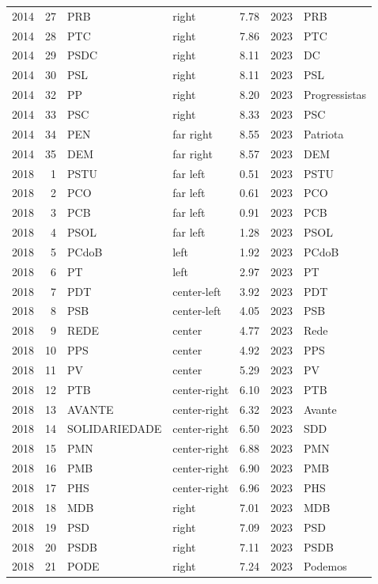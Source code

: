 \documentclass[11pt]{article}
\begin{document}
\begin{longtable}{rrlllrl}
2014 & 27 & PRB & right & 7.78 & 2023 & PRB \\
2014 & 28 & PTC & right & 7.86 & 2023 & PTC \\
2014 & 29 & PSDC & right & 8.11 & 2023 & DC \\
2014 & 30 & PSL & right & 8.11 & 2023 & PSL \\
2014 & 32 & PP & right & 8.20 & 2023 & Progressistas \\
2014 & 33 & PSC & right & 8.33 & 2023 & PSC \\
2014 & 34 & PEN & far right & 8.55 & 2023 & Patriota \\
2014 & 35 & DEM & far right & 8.57 & 2023 & DEM \\
2018 & 1 & PSTU & far left & 0.51 & 2023 & PSTU \\
2018 & 2 & PCO & far left & 0.61 & 2023 & PCO \\
2018 & 3 & PCB & far left & 0.91 & 2023 & PCB \\
2018 & 4 & PSOL & far left & 1.28 & 2023 & PSOL \\
2018 & 5 & PCdoB & left & 1.92 & 2023 & PCdoB \\
2018 & 6 & PT & left & 2.97 & 2023 & PT \\
2018 & 7 & PDT & center-left & 3.92 & 2023 & PDT \\
2018 & 8 & PSB & center-left & 4.05 & 2023 & PSB \\
2018 & 9 & REDE & center & 4.77 & 2023 & Rede \\
2018 & 10 & PPS & center & 4.92 & 2023 & PPS \\
2018 & 11 & PV & center & 5.29 & 2023 & PV \\
2018 & 12 & PTB & center-right & 6.10 & 2023 & PTB \\
2018 & 13 & AVANTE & center-right & 6.32 & 2023 & Avante \\
2018 & 14 & SOLIDARIEDADE & center-right & 6.50 & 2023 & SDD \\
2018 & 15 & PMN & center-right & 6.88 & 2023 & PMN \\
2018 & 16 & PMB & center-right & 6.90 & 2023 & PMB \\
2018 & 17 & PHS & center-right & 6.96 & 2023 & PHS \\
2018 & 18 & MDB & right & 7.01 & 2023 & MDB \\
2018 & 19 & PSD & right & 7.09 & 2023 & PSD \\
2018 & 20 & PSDB & right & 7.11 & 2023 & PSDB \\
2018 & 21 & PODE & right & 7.24 & 2023 & Podemos \\

\end{longtable}
\end{document}
